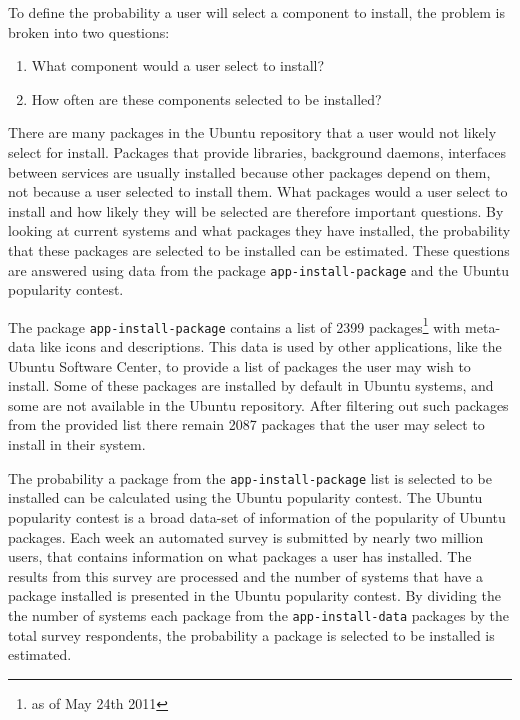 To define the probability a user will select a component to install, the problem is broken into two questions:
\begin{enumerate}
  \item What component would a user select to install?
  \item How often are these components selected to be installed?
\end{enumerate}
There are many packages in the Ubuntu repository that a user would not likely select for install.
Packages that provide libraries, background daemons, interfaces between services are usually installed because other packages depend on them, not because a user selected to install them.
What packages would a user select to install and how likely they will be selected are therefore important questions.
By looking at current systems and what packages they have installed, the probability that these packages are selected to be installed can be estimated.
These questions are answered using data from the package \texttt{app-install-package} and the Ubuntu popularity contest.

The package \texttt{app-install-package} contains a list of 2399 packages\footnote{as of May 24th 2011} with meta-data like icons and descriptions.
This data is used by other applications, like the Ubuntu Software Center, to provide a list of packages the user may wish to install.
Some of these packages are installed by default in Ubuntu systems, and some are not available in the Ubuntu repository.
After filtering out such packages from the provided list there remain 2087 packages that the user may select to install in their system. 

The probability a package from the \texttt{app-install-package} list is selected to be installed can be calculated using the Ubuntu popularity contest.
The Ubuntu popularity contest is a broad data-set of information of the popularity of Ubuntu packages.
Each week an automated survey is submitted by nearly two million users, that contains information on what packages a user has installed.
The results from this survey are processed and the number of systems that have a package installed is presented in the Ubuntu popularity contest.
By dividing the the number of systems each package from the \texttt{app-install-data} packages  by the total survey respondents, 
the probability a package is selected to be installed is estimated.

